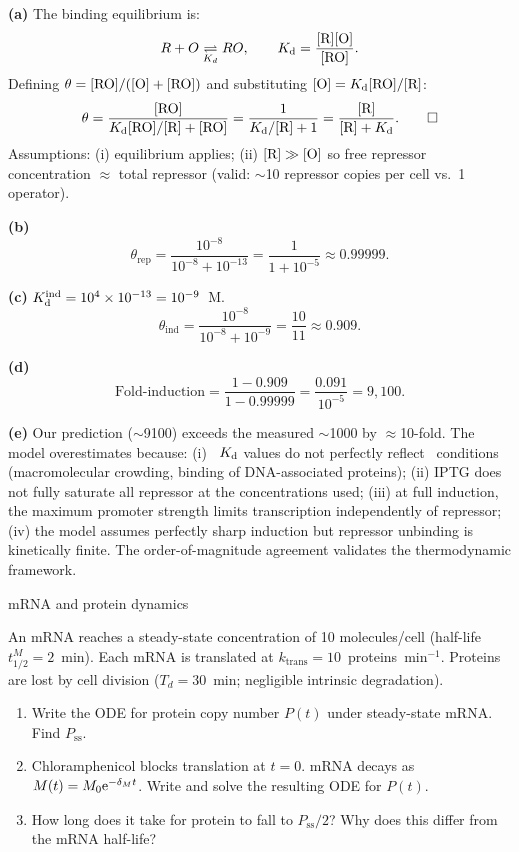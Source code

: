 \documentclass[12pt, a4paper, oneside]{report}
\begin{document}
\begin{solution}
  \textbf{(a)} The binding equilibrium is:
  \[
    R + O \underset{K_d}{\rightleftharpoons} RO, \qquad
    K_{\mathrm{d}} = \frac{[\mathrm{R}][\mathrm{O}]}{[\mathrm{RO}]}.
  \]
  Defining $\theta = [\mathrm{RO}]/([\mathrm{O}]+[\mathrm{RO}])$ and substituting
  $[\mathrm{O}] = K_{\mathrm{d}}[\mathrm{RO}]/[\mathrm{R}]$:
  \[
    \theta
    = \frac{[\mathrm{RO}]}{K_{\mathrm{d}}[\mathrm{RO}]/[\mathrm{R}] + [\mathrm{RO}]}
    = \frac{1}{K_{\mathrm{d}}/[\mathrm{R}] + 1}
    = \frac{[\mathrm{R}]}{[\mathrm{R}] + K_{\mathrm{d}}}. \qquad\square
  \]
  Assumptions: (i) equilibrium applies; (ii) $[\mathrm{R}] \gg [\mathrm{O}]$
  so free repressor concentration $\approx$ total repressor
  (valid: $\sim$10 repressor copies per cell vs.\ 1 operator).

  \textbf{(b)}
  \[
    \theta_\text{rep}
    = \frac{10^{-8}}{10^{-8} + 10^{-13}}
    = \frac{1}{1 + 10^{-5}}
    \approx 0.99999.
  \]

  \textbf{(c)} $K_{\mathrm{d}}^\text{ind} = 10^4 \times 10^{-13} = 10^{-9}$~M.
  \[
    \theta_\text{ind}
    = \frac{10^{-8}}{10^{-8} + 10^{-9}}
    = \frac{10}{11} \approx 0.909.
  \]

  \textbf{(d)}
  \[
    \text{Fold-induction}
    = \frac{1 - 0.909}{1 - 0.99999}
    = \frac{0.091}{10^{-5}}
    = \boxed{9{,}100}.
  \]

  \textbf{(e)} Our prediction ($\sim$9100) exceeds the measured $\sim$1000
  by $\approx$10-fold. The model overestimates because: (i) \invitro\
  $K_{\mathrm{d}}$ values do not perfectly reflect \invivo\ conditions (macromolecular
  crowding, binding of DNA-associated proteins); (ii) IPTG does not fully
  saturate all repressor at the concentrations used; (iii) at full
  induction, the maximum promoter strength limits transcription
  independently of repressor; (iv) the model assumes perfectly sharp
  induction but repressor unbinding is kinetically finite.
  The order-of-magnitude agreement validates the thermodynamic framework.
\end{solution}

\begin{problem}{\enspace{}\enspace{}\enspace mRNA and protein dynamics}

  An mRNA reaches a steady-state concentration of 10 molecules/cell
  (half-life $t_{1/2}^M = 2$~min). Each mRNA is translated at
  $k_\text{trans} = 10$~proteins~min$^{-1}$. Proteins are lost by
  cell division ($T_d = 30$~min; negligible intrinsic degradation).

  \begin{enumerate}
    \item Write the ODE for protein copy number $P(t)$ under steady-state
          mRNA. Find $P_\text{ss}$.
    \item Chloramphenicol blocks translation at $t = 0$. mRNA decays as
          $M(t) = M_0\mathrm{e}^{-\delta_M t}$. Write and solve the resulting ODE
          for $P(t)$.
    \item How long does it take for protein to fall to $P_\text{ss}/2$?
          Why does this differ from the mRNA half-life?
  \end{enumerate}
\end{problem}
\end{document}
